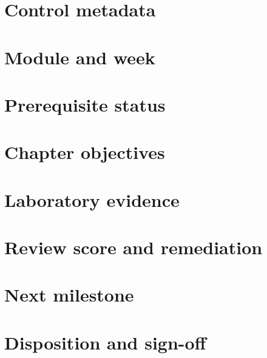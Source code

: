 \documentclass[11pt,letterpaper]{article}
\begin{document}
\makedoctitle\makedocsummary
\section{Control metadata}
\section{Module and week}
\section{Prerequisite status}
\section{Chapter objectives}
\section{Laboratory evidence}
\section{Review score and remediation}
\section{Next milestone}
\section{Disposition and sign-off}
\end{document}

